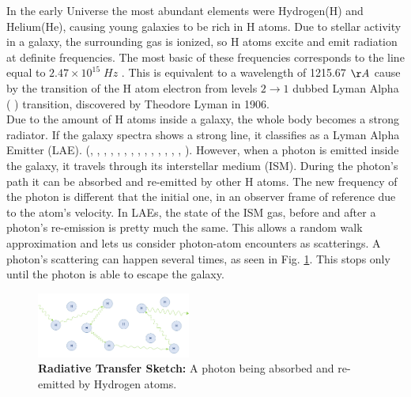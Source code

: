\documentclass[twocolappendix]{latex/emulateapj}
\begin{document}
In the early Universe the most abundant elements were Hydrogen(H) and Helium(He), causing young galaxies to be rich in H atoms. Due to stellar activity in a galaxy, the surrounding gas is ionized, so H atoms excite and emit radiation at definite frequencies. The most basic of these frequencies corresponds to the \lya line equal to $2.47 \times 10^{15}\;Hz$ \cite{PartridgePeebles}. This is equivalent to a wavelength of 1215.67 $\AA$ cause by the transition of the H atom electron from levels $2\rightarrow1$ dubbed Lyman Alpha ( \lya) transition, discovered by Theodore Lyman in 1906. \cite{LymanBio} \\

Due to the amount of H atoms inside a galaxy, the whole body becomes a strong \lya radiator. If the galaxy spectra shows a strong \lya line, it classifies as a Lyman Alpha Emitter (LAE). (\cite{DjorgovskiThompson}, \cite{Rhoads00}, \cite{Gawiser2007}, \cite{Koehler2007}, \cite{Ouchi08}, \cite{Yamada2012}, \cite{Schenker2012}, \cite{Kulas12}, \cite{Yamada2012}, \cite{Chonis2013}, \cite{Finkelstein2013}, \cite{Ostlin14}, \cite{Hayes2014}, \cite{Faisst2014}, \cite{Fumagalli2015}). However, when a \lya photon is emitted inside the galaxy, it travels through its interstellar medium (ISM). During the photon's path it can be absorbed and re-emitted by other H atoms. The new frequency of the photon is different that the initial one, in an observer frame of reference due to the atom's velocity. In LAEs, the state of the ISM gas, before and after a photon's re-emission is pretty much the same. This allows a random walk approximation and lets us consider photon-atom encounters as scatterings. A photon's scattering can happen several times, as seen in Fig. \ref{fig:radiative_transfer}. This stops only until the photon is able to escape the galaxy. \\

\begin{figure}[h!]
	\begin{center}
		\includegraphics[width=0.45\textwidth]{./figures/radiative_transfer}
	\end{center}
	\caption{\textbf{Radiative Transfer Sketch:} A \lya photon being absorbed and re-emitted by Hydrogen atoms. 
		\label{fig:radiative_transfer}}
\end{figure}
\end{document}
